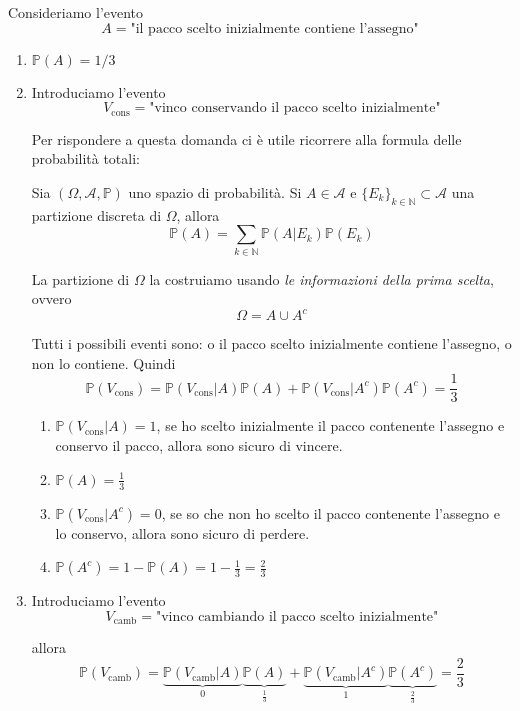 Consideriamo l'evento
\begin{equation*}
A=\text{"il pacco scelto inizialmente contiene l'assegno"}
\end{equation*}
\begin{enumerate}
\item $\mathbb{P}( A) =1/3$
\item Introduciamo l'evento\begin{equation*}
V_{\text{cons}} =\text{"vinco conservando il pacco scelto inizialmente"}
\end{equation*}

Per rispondere a questa domanda ci è utile ricorrere alla formula delle probabilità totali:\begin{theorem}
Sia $( \Omega ,\mathcal{A} ,\mathbb{P})$ uno spazio di probabilità. Si $A\in \mathcal{A}$ e $\{E_{k}\}_{k\in \mathbb{N}} \subset \mathcal{A}$ una partizione discreta di $\Omega $, allora
\begin{equation*}
\mathbb{P}( A) =\sum\limits _{k\in \mathbb{N}}\mathbb{P}( A|E_{k})\mathbb{P}( E_{k})
\end{equation*}
\end{theorem}

La partizione di $\Omega $ la costruiamo usando \textit{le informazioni della prima scelta}, ovvero\begin{equation*}
\Omega =A\cup A^{c}
\end{equation*}

Tutti i possibili eventi sono: o il pacco scelto inizialmente contiene l'assegno, o non lo contiene. Quindi\begin{equation*}
\mathbb{P}( V_{\text{cons}}) =\mathbb{P}( V_{\text{cons}} |A)\mathbb{P}( A) +\mathbb{P}\left( V_{\text{cons}} |A^{c}\right)\mathbb{P}\left( A^{c}\right) =\frac{1}{3}
\end{equation*}
\begin{enumerate}
\item $\mathbb{P}( V_{\text{cons}} |A) =1$, se ho scelto inizialmente il pacco contenente l'assegno e conservo il pacco, allora sono sicuro di vincere.
\item $\mathbb{P}( A) =\frac{1}{3}$
\item $\mathbb{P}\left( V_{\text{cons}} |A^{c}\right) =0$, se so che non ho scelto il pacco contenente l'assegno e lo conservo, allora sono sicuro di perdere.
\item $\mathbb{P}\left( A^{c}\right) =1-\mathbb{P}( A) =1-\frac{1}{3} =\frac{2}{3}$
\end{enumerate}
\item Introduciamo l'evento\begin{equation*}
V_{\text{camb}} =\text{"vinco cambiando il pacco scelto inizialmente"}
\end{equation*}

allora\begin{equation*}
\mathbb{P}( V_{\text{camb}}) =\underbrace{\mathbb{P}( V_{\text{camb}} |A)}_{0}\underbrace{\mathbb{P}( A)}_{\frac{1}{3}} +\underbrace{\mathbb{P}\left( V_{\text{camb}} |A^{c}\right)}_{1}\underbrace{\mathbb{P}\left( A^{c}\right)}_{\frac{2}{3}} =\frac{2}{3}
\end{equation*}
\end{enumerate}

